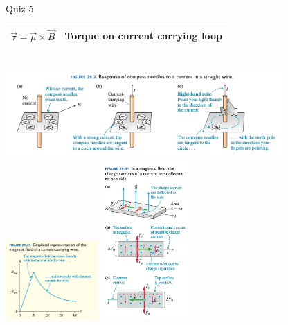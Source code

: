 \documentclass{article}
\begin{document}
\begin{section}{Quiz 5}
\begin{tabular}{|c|c|}
	 $\vec \tau = \vec \mu \times \vec B$                                                                                                   & Torque on current carrying loop                                    \\
	 \hline
 \end{tabular}
 \\
 \includegraphics[width=300pt]{final_cheet_sheet_resources/aqszphbxmjmblmaspimhdejdjiugbttc.jpg}
 \includegraphics[width=100pt]{final_cheet_sheet_resources/kaozdeuaxhzkquewempuyqchdccgvzoq.jpg}
 \includegraphics[width=100pt]{final_cheet_sheet_resources/mgsmwhhorrooccpddtidybfkximnvaok.jpg}
\end{section}
\end{document}

